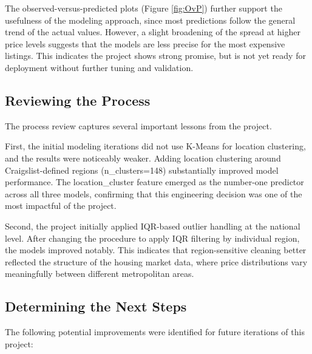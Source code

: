 \noindent
The observed-versus-predicted plots (Figure \ref{fig:OvP}) further support the usefulness of the modeling approach, since most predictions follow the general trend of the actual values. However, a slight broadening of the spread at higher price levels suggests that the models are less precise for the most expensive listings. This indicates the project shows strong promise, but is not yet ready for deployment without further tuning and validation.

\subsection{Reviewing the Process}

\noindent
The process review captures several important lessons from the project.

\noindent
First, the initial modeling iterations did not use K-Means for location clustering, and the results were noticeably weaker. Adding location clustering around Craigslist-defined regions (n\_clusters=148) substantially improved model performance. The location\_cluster feature emerged as the number-one predictor across all three models, confirming that this engineering decision was one of the most impactful of the project.

\noindent
Second, the project initially applied IQR-based outlier handling at the national level. After changing the procedure to apply IQR filtering by individual region, the models improved notably. This indicates that region-sensitive cleaning better reflected the structure of the housing market data, where price distributions vary meaningfully between different metropolitan areas.

\subsection{Determining the Next Steps}

\noindent
The following potential improvements were identified for future iterations of this project:


